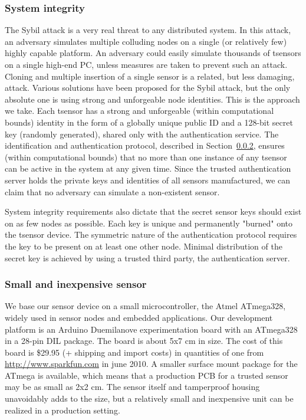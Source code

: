 \subsubsection{System integrity}

The Sybil attack \cite{Douceur2002} is a very real threat to any distributed system. In this attack, an adversary simulates multiple colluding nodes on a single (or relatively few) highly capable platform. An adversary could easily simulate thousands of tsensors on a single high-end PC, unless measures are taken to prevent such an attack. Cloning and multiple insertion of a single sensor is a related, but less damaging, attack.
%
Various solutions have been proposed for the Sybil attack, but the only absolute one is using strong and unforgeable node identities. This is the approach we take. Each tsensor has a strong and unforgeable (within computational bounds) identity in the form of a globally unique public ID and a 128-bit secret key (randomly generated), shared only with the authentication service. The identification and authentication protocol, described in Section~\ref{}, ensures (within computational bounds) that no more than one instance of any tsensor can be active in the system at any given time. Since the trusted authentication server holds the private keys and identities of all sensors manufactured, we can claim that no adversary can simulate a non-existent sensor.

System integrity requirements also dictate that the secret sensor keys should exist on as few nodes as possible. Each key is unique and permanently "burned" onto the tsensor device. The symmetric nature of the authentication protocol requires the key to be present on at least one other node. Minimal distribution of the secret key is achieved by using a trusted third party, the authentication server.

\subsubsection{Small and inexpensive sensor}

We base our sensor device on a small microcontroller, the Atmel ATmega328, widely used in sensor nodes and embedded applications. Our development platform is an Arduino Duemilanove experimentation board with an ATmega328 in a 28-pin DIL package. The board is about 5x7 cm in size.
The cost of this board is \$29.95 (+ shipping and import costs) in quantities of one from \url{http://www.sparkfun.com} in june 2010. 
%
A smaller surface mount package for the ATmega is available, which means that a production PCB for a trusted sensor may be as small as 2x2 cm. The sensor itself and tamperproof housing unavoidably adds to the size, but a relatively small and inexpensive unit can be realized in a production setting.


